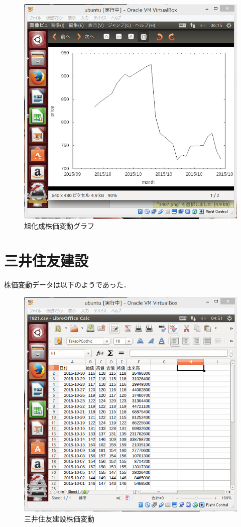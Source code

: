 {\begin{figure}[H]
\centering
\includegraphics[width=15cm]{3407.PNG}
\caption{旭化成株価変動グラフ}\label{サンプル図}
\end{figure}




\section{三井住友建設}

株価変動データは以下のようであった．


\begin{figure}[H]
\centering
\includegraphics[width=15cm]{1821csv.PNG}
\caption{三井住友建設株価変動}\label{サンプル図}
\end{figure}


}
